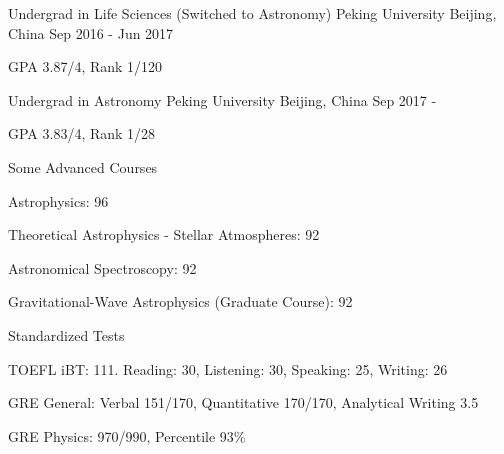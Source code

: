 


\begin{cventries}


\cventry
{Undergrad in Life Sciences (Switched to Astronomy)} %
{Peking University} %
{Beijing, China} %
{Sep 2016 - Jun 2017} %
{ %
	\begin{cvitems}
		\item {GPA 3.87/4, Rank 1/120}
	\end{cvitems}
}

\cventry
{Undergrad in Astronomy} %
{Peking University} %
{Beijing, China} %
{Sep 2017 - } %
{ %
	\begin{cvitems}
		\item {GPA 3.83/4, Rank 1/28}
	\end{cvitems}
}

\cventry
{Some Advanced Courses} %
{} %
{} %
{} %
{ %
	\begin{cvitems}
		\item {Astrophysics: 96}
		\item {Theoretical Astrophysics - Stellar Atmospheres: 92}
		\item {Astronomical Spectroscopy: 92}
		\item {Gravitational-Wave Astrophysics (Graduate Course): 92}
	\end{cvitems}
}

\cventry
{Standardized Tests} %
{} %
{} %
{} %
{ %
	\begin{cvitems}
		\item {TOEFL iBT: 111. Reading: 30, Listening: 30, Speaking: 25, Writing: 26}
		\item {GRE General: Verbal 151/170, Quantitative 170/170, Analytical Writing 3.5}
		\item {GRE Physics: 970/990, Percentile 93\%}
	\end{cvitems}
}


\end{cventries}